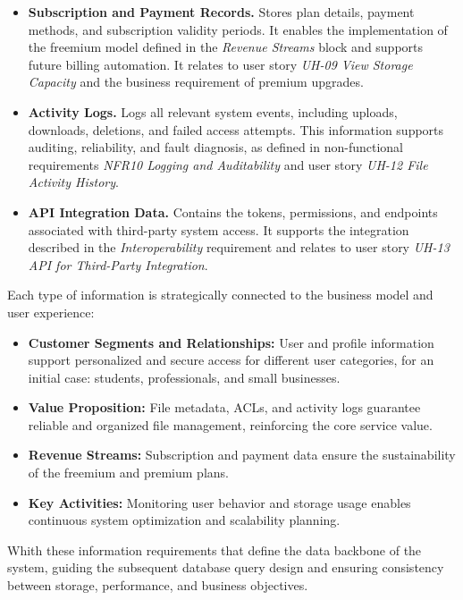 \begin{itemize}
    \item \textbf{Subscription and Payment Records.} 
    Stores plan details, payment methods, and subscription validity periods. 
    It enables the implementation of the freemium model defined in the \textit{Revenue Streams} block and supports future billing automation. 
    It relates to user story \textit{UH-09 View Storage Capacity} and the business requirement of premium upgrades.

    \item \textbf{Activity Logs.} 
    Logs all relevant system events, including uploads, downloads, deletions, and failed access attempts. 
    This information supports auditing, reliability, and fault diagnosis, as defined in non-functional requirements \textit{NFR10 Logging and Auditability} and user story \textit{UH-12 File Activity History}.

    \item \textbf{API Integration Data.} 
    Contains the tokens, permissions, and endpoints associated with third-party system access. 
    It supports the integration described in the \textit{Interoperability} requirement and relates to user story \textit{UH-13 API for Third-Party Integration}.
\end{itemize}

Each type of information is strategically connected to the business model and user experience:

\begin{itemize}
    \item \textbf{Customer Segments and Relationships:} 
    User and profile information support personalized and secure access for different user categories, for an initial case: students, professionals, and small businesses.
    \item \textbf{Value Proposition:} 
    File metadata, ACLs, and activity logs guarantee reliable and organized file management, reinforcing the core service value.
    \item \textbf{Revenue Streams:} 
    Subscription and payment data ensure the sustainability of the freemium and premium plans.
    \item \textbf{Key Activities:} 
    Monitoring user behavior and storage usage enables continuous system optimization and scalability planning.
\end{itemize}

Whith these information requirements that define the data backbone of the system, guiding the subsequent database query design and ensuring consistency between storage, performance, and business objectives.